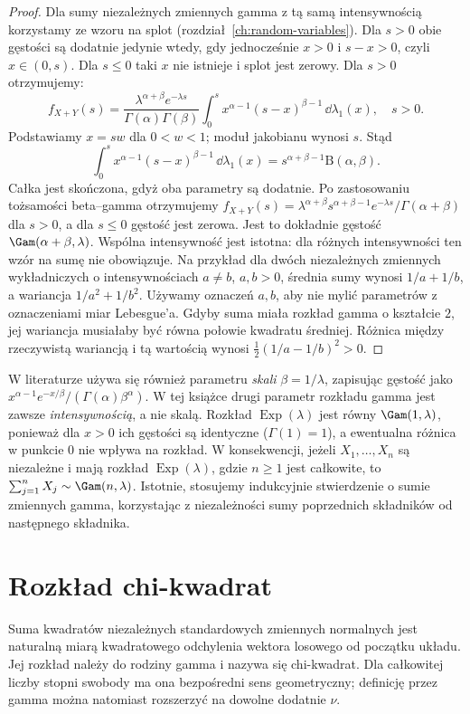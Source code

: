 \begin{proof}
Dla sumy niezależnych zmiennych gamma z tą samą
intensywnością korzystamy ze wzoru na splot
(rozdział~\ref{ch:random-variables}).
Dla $s>0$ obie gęstości są dodatnie jedynie wtedy,
gdy jednocześnie $x>0$ i $s-x>0$, czyli $x\in(0,s)$.
Dla $s\leq0$ taki $x$ nie istnieje i splot jest zerowy.
Dla $s>0$ otrzymujemy:
\[
f_{X+Y}(s)=\frac{\lambda^{\alpha+\beta}e^{-\lambda s}}
{\Gamma(\alpha)\Gamma(\beta)}
\int_0^s x^{\alpha-1}(s-x)^{\beta-1}\,\dd\lambda_1(x),
\quad s>0.
\]
Podstawiamy $x=sw$ dla $0<w<1$; moduł jakobianu
wynosi $s$. Stąd
\[
\int_0^s x^{\alpha-1}(s-x)^{\beta-1}\,\dd\lambda_1(x)
=s^{\alpha+\beta-1}\mathrm B(\alpha,\beta).
\]
Całka jest skończona, gdyż oba parametry są dodatnie.
Po zastosowaniu tożsamości beta--gamma otrzymujemy
$f_{X+Y}(s)=\lambda^{\alpha+\beta}s^{\alpha+\beta-1}
e^{-\lambda s}/\Gamma(\alpha+\beta)$ dla $s>0$,
a dla $s\leq0$ gęstość jest zerowa. Jest to dokładnie
gęstość $\Gam(\alpha+\beta,\lambda)$.
Wspólna intensywność jest istotna: dla różnych
intensywności ten wzór na sumę nie obowiązuje.
Na przykład dla dwóch niezależnych zmiennych wykładniczych
o intensywnościach $a\ne b$, $a,b>0$, średnia sumy
wynosi $1/a+1/b$, a wariancja $1/a^2+1/b^2$.
Używamy oznaczeń $a,b$, aby nie mylić parametrów
z oznaczeniami miar Lebesgue'a.
Gdyby suma miała rozkład gamma o kształcie $2$,
jej wariancja musiałaby być równa połowie kwadratu średniej.
Różnica między rzeczywistą wariancją i tą wartością wynosi
$\tfrac12(1/a-1/b)^2>0$.
\end{proof}

\begin{uwaga}
W literaturze używa się również parametru \emph{skali}
$\beta=1/\lambda$, zapisując gęstość jako
$x^{\alpha-1}e^{-x/\beta}/(\Gamma(\alpha)\beta^\alpha)$.
W tej książce drugi parametr rozkładu gamma jest zawsze
\emph{intensywnością}, a nie skalą.
Rozkład $\operatorname{Exp}(\lambda)$ jest równy $\Gam(1,\lambda)$,
ponieważ dla $x>0$ ich gęstości są identyczne
($\Gamma(1)=1$), a ewentualna różnica w punkcie $0$
nie wpływa na rozkład.
W konsekwencji, jeżeli $X_1,\ldots,X_n$ są niezależne
i mają rozkład $\operatorname{Exp}(\lambda)$, gdzie
$n\geq1$ jest całkowite, to $\sum_{j=1}^n X_j\sim\Gam(n,\lambda)$.
Istotnie, stosujemy indukcyjnie stwierdzenie o sumie
zmiennych gamma, korzystając z niezależności sumy
poprzednich składników od następnego składnika.
\end{uwaga}

\section{Rozkład chi-kwadrat}
Suma kwadratów niezależnych standardowych zmiennych normalnych
jest naturalną miarą kwadratowego odchylenia wektora losowego
od początku układu. Jej rozkład należy do rodziny gamma i
nazywa się chi-kwadrat. Dla całkowitej liczby stopni swobody
ma ona bezpośredni sens geometryczny; definicję przez gamma
można natomiast rozszerzyć na dowolne dodatnie $\nu$.

